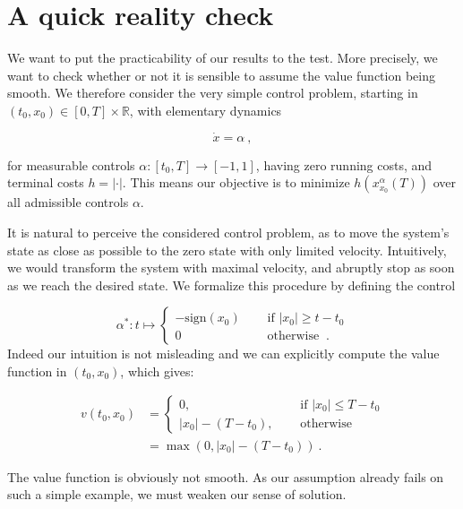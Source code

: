 
	\section{A quick reality check}
	
	\label{non-smooth}
	
	We want to put the practicability of our results to the test. More precisely, we want to check whether or not it is sensible to assume the value function being smooth. We therefore consider the very simple control problem, starting in $ (t_0, x_0) \in \left[ 0 , T \right] \times \mathbb{R} $, with elementary dynamics
	
	\begin{equation*}
		\dot{x} = \alpha \ ,
	\end{equation*}
	
	for measurable controls $ \alpha : \left[ t_0, T \right] \to \left[-1, 1\right] $, having zero running costs, and terminal costs $ h = \lvert \cdot \rvert $. This means our objective is to minimize $ h(x^{\alpha}_{x_0}(T)) $ over all admissible controls $ \alpha $.
	
	It is natural to perceive the considered control problem, as to move the system's state as close as possible to the zero state with only limited velocity. Intuitively, we would transform the system with maximal velocity, and abruptly stop as soon as we reach the desired state. We formalize this procedure by defining the control
	
	\begin{equation*}
		\alpha^{*} : t \mapsto \begin{cases}
		-\text{sign}(x_0) \quad &\text{ if } \lvert x_0 \rvert \geq t - t_0 \\
		0 \quad &\text{ otherwise } \ .
		\end{cases}
	\end{equation*}
	Indeed our intuition is not misleading and we can explicitly compute the value function in $ (t_0, x_0) $, which gives:
	
	\begin{align*}
		v(t_0, x_0) &= \begin{cases}
		0, \quad &\text{ if } |x_0| \leq T - t_0 \\
		|x_0| - (T - t_0), \quad &\text{ otherwise }
		\end{cases} \\
		&= \max(0, |x_0| - (T - t_0)) \ .
	\end{align*}
	
	The value function is obviously not smooth. As our assumption already fails on such a simple example, we must weaken our sense of solution.
	
